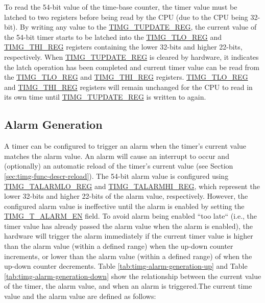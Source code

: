 \documentclass[main\_\_EN.tex]{subfiles}
\begin{document}
To read the 54-bit value of the time-base counter, the timer value must be latched to two registers before being read by the CPU (due to the CPU being 32-bit). By writing any value to the \hyperref[regdesc:TIMGTXUPDATEREG]{TIMG\_TUPDATE\_REG}, the current value of the 54-bit timer starts to be latched into the \hyperref[regdesc:TIMGTXLOREG]{TIMG\_TLO\_REG} and \hyperref[regdesc:TIMGTXHIREG]{TIMG\_THI\_REG} registers containing the lower 32-bits and
higher 22-bits, respectively. When \hyperref[regdesc:TIMGTXUPDATEREG]{TIMG\_TUPDATE\_REG} is cleared by hardware, it indicates the latch operation has been completed and current timer value can be read from the \hyperref[regdesc:TIMGTXLOREG]{TIMG\_TLO\_REG} and \hyperref[regdesc:TIMGTXHIREG]{TIMG\_THI\_REG} registers. \hyperref[regdesc:TIMGTXLOREG]{TIMG\_TLO\_REG} and \hyperref[regdesc:TIMGTXHIREG]{TIMG\_THI\_REG} registers will remain unchanged for the CPU to read in its own time until \hyperref[regdesc:TIMGTXUPDATEREG]{TIMG\_TUPDATE\_REG} is written to again.

\subsection{Alarm Generation}
A timer can be configured to trigger an alarm when the timer's current value matches the alarm value. An alarm will cause an interrupt to occur and (optionally) an automatic reload of the timer's current value (see Section \ref{sec:timg-func-descr-reload}).
The 54-bit alarm value is configured using \hyperref[regdesc:TIMGTXALARMLOREG]{TIMG\_TALARMLO\_REG} and \hyperref[regdesc:TIMGTXALARMHIREG]{TIMG\_TALARMHI\_REG}, which
represent the lower 32-bits and higher 22-bits of the alarm value, respectively. However, the configured alarm value is ineffective until the alarm is enabled by setting the \hyperref[fielddesc:TIMGTXALARMEN]{TIMG\_T\_ALARM\_EN} field. To avoid alarm being enabled ``too late`` (i.e., the timer value has already passed the alarm value when the alarm is enabled), the hardware will trigger the  alarm immediately if the current timer value is higher than the alarm value (within a defined range) when the up-down counter increments, or lower than the alarm value (within a defined range) of when the up-down counter decrements. Table \ref{tab:timg-alarm-generation-up} and Table \ref{tab:timg-alarm-generation-down} show the relationship between the current value of the timer, the alarm value, and when an alarm is triggered.The current time value and the alarm value are defined as follows:
\end{document}
